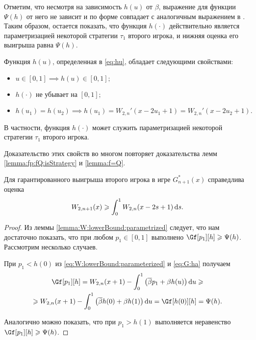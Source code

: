 {Отметим, что несмотря на зависимость $h(u)$ от $\beta$, выражение для функции $\Psi(h)$ от него не зависит и по форме совпадает с аналогичным выражением в \cite{demeyer02}.
Таким образом, остается показать, что функция $h(\cdot)$ действительно является параметризацией некоторой стратегии $\tau_1$ второго игрока, и нижняя оценка его выигрыша равна $\Psi(h)$.

\begin{lemma}\label{lemma:hu:props}
  Функция $h(u)$, определенная в \eqref{eq:hu}, обладает следующими свойствами:
  \begin{itemize}
  \item
    $u \in [0, 1] \implies h(u) \in [0, 1];$
  \item
    $h(\cdot)$ не убывает на $[0, 1];$
  \item
    $
    h(u_1) = h(u_2) \implies
    h(u_1) = W_{2,n}'(x - 2u_1 + 1) = W_{2,n}'(x - 2u_2 + 1).
    $
  \end{itemize}
  В частности, функция $h(\cdot)$ может служить параметризацией некоторой стратегии $\tau_1$ второго игрока.
\end{lemma}
Доказательство этих свойств во многом повторяет доказательства лемм \ref{lemma:fp:fQ:isStrategy} и \ref{lemma:f=Q}.

\begin{theorem}\label{theorem:W:bound}
  Для гарантированного выигрыша второго игрока в игре $G_{n+1}^*(x)$ справедлива оценка
  \begin{equation*}
    W_{2,n+1}(x) \geqslant \int_0^1 W_{2,n}(x - 2s + 1) \mathop{}\!\mathrm{d} s.
  \end{equation*}
\end{theorem}
\begin{proof}
  Из леммы \ref{lemma:W:lowerBound:parametrized} следует, что нам достаточно показать, что при любом $p_1 \in [0, 1]$ выполнено $\Gf[p_1][h] \geqslant \Psi(h)$.
  Рассмотрим несколько случаев.

  При $p_1 < h(0)$ из \eqref{eq:W:lowerBound:parameterized} и \eqref{eq:G:ha} получаем
  \begin{multline*}
    \Gf[p_1][h] =
    W_{2,n}(x + 1) - \int_0^1 \left( \DCo p_1 + \Co h(u) \right) \di u \geqslant \\
    \geqslant W_{2,n}(x + 1) - \int_0^1 \left( \DCo h(0) + \Co h(1) \right) \di u =
    \Gf[h(0)][h] = \Psi(h).
  \end{multline*}

  Аналогично можно показать, что при $p_1 > h(1)$ выполняется неравенство $\Gf[p_1][h] \geqslant \Psi(h)$.


\end{proof}}
